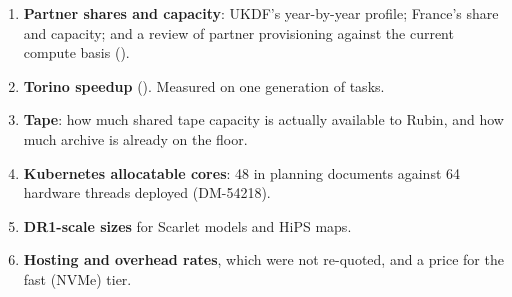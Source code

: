 \begin{enumerate}
      Qserv has a node gap at DR1 ().
\item \textbf{Partner shares and capacity}: UKDF's year-by-year profile;
      France's share and capacity; and a review of partner provisioning
      against the current compute basis ().
\item \textbf{Torino speedup} (\smSpeedup). Measured on one generation of
      tasks.
\item \textbf{Tape}: how much shared tape capacity is actually available to
      Rubin, and how much archive is already on the floor.
\item \textbf{Kubernetes allocatable cores}: 48 in planning documents against
      64 hardware threads deployed (DM-54218).
\item \textbf{DR1-scale sizes} for Scarlet models and HiPS maps.
\item \textbf{Hosting and overhead rates}, which were not re-quoted, and a
      price for the fast (NVMe) tier.
\end{enumerate}
